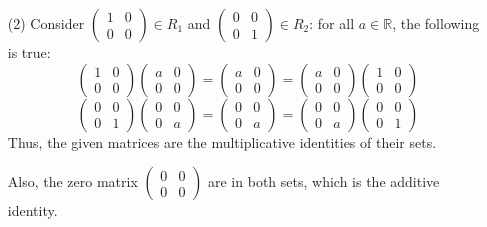 \documentclass{article}
\begin{document}
\begin{itemize}
    \item[(2)] Consider $\begin{pmatrix}
        1&0\\0&0
    \end{pmatrix}\in R_1$ and $\begin{pmatrix}
        0&0\\0&1
    \end{pmatrix}\in R_2$: for all $a\in\mathbb{R}$, the following is true:
    $$\begin{pmatrix}
        1&0\\0&0
    \end{pmatrix}\begin{pmatrix}
        a&0\\0&0
    \end{pmatrix} = \begin{pmatrix}
        a&0\\0&0
    \end{pmatrix} = \begin{pmatrix}
        a&0\\0&0
    \end{pmatrix}\begin{pmatrix}
        1&0\\0&0
    \end{pmatrix}$$
    $$\begin{pmatrix}
        0&0\\0&1
    \end{pmatrix}\begin{pmatrix}
        0&0\\0&a
    \end{pmatrix} = \begin{pmatrix}
        0&0\\0&a
    \end{pmatrix} = \begin{pmatrix}
        0&0\\0&a
    \end{pmatrix}\begin{pmatrix}
        0&0\\0&1
    \end{pmatrix}$$
    Thus, the given matrices are the multiplicative identities of their sets.

    Also, the zero matrix $\begin{pmatrix}
        0&0\\0&0
    \end{pmatrix}$ are in both sets, which is the additive identity.


\end{itemize}
\end{document}
